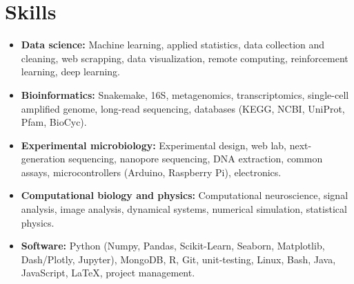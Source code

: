 \documentclass[letterpaper,11pt]{article}
\newcommand{\resumeSubItem}[2]{\item \textbf{#1}{ #2\vspace{-2pt}}\vspace{-4pt}}
\newcommand{\resumeSubHeadingListStart}{\begin{itemize}[leftmargin=*]}
\newcommand{\resumeSubHeadingListEnd}{\end{itemize}}
\begin{document}


\section{Skills}
 \resumeSubHeadingListStart
   \resumeSubItem{Data science:}{Machine learning, applied statistics, data collection and cleaning, web scrapping, data visualization, remote computing, reinforcement learning, deep learning.}
   \resumeSubItem{Bioinformatics:}{Snakemake, 16S, metagenomics, transcriptomics, single-cell amplified genome, long-read sequencing, databases (KEGG, NCBI, UniProt, Pfam, BioCyc).}
   \resumeSubItem{Experimental microbiology:}{Experimental design, web lab, next-generation sequencing, nanopore sequencing, DNA extraction, common assays, microcontrollers (Arduino, Raspberry Pi), electronics.}
   \resumeSubItem{Computational biology and physics:}{Computational neuroscience, signal analysis, image analysis, dynamical systems,  numerical simulation, statistical physics.}
   \resumeSubItem{Software:}{Python (Numpy, Pandas, Scikit-Learn, Seaborn, Matplotlib, Dash/Plotly, Jupyter), MongoDB, R, Git, unit-testing, Linux, Bash, Java, JavaScript, \LaTeX, project management.}
 \resumeSubHeadingListEnd


\end{document}

